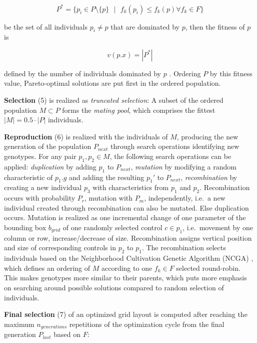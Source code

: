 \begin{equation}P^* = \big\{p_i \in P \setminus\{p\}  \text{ }|\text{ } f_k(p_i) \leq f_k(p) \forall f_k \in F \big\}\end{equation}

be the set of all individuals \(p_i \neq p\) that are dominated by \(p\), then the fitness of \(p\) is

\begin{equation}v(p.x) = |P^*|\label{eq:fitness}\end{equation}

defined by the number of individuals dominated by \(p\) \autocite{Weise2009Optimization}.
Ordering \(P\) by this fitness value, Pareto-optimal solutions are put first in the ordered population.

\textbf{Selection} (5) is realized as \emph{truncated selection}: A subset of the ordered population \(M \subset P\) forms the \emph{mating pool}, which comprises the fittest \(|M| = 0.5 \cdot |P|\) individuals.

\textbf{Reproduction} (6) is realized with the individuals of \(M\), producing the new generation of the population \(P_{next}\) through search operations identifying new genotypes.
For any pair \(p_1, p_2 \in M\), the following search operations can be applied: \emph{duplication} by adding \(p_1\) to \(P_{next}\), \emph{mutation} by modifying a random characteristic of \(p_1.g\) and adding the resulting \(p_1'\) to \(P_{next}\), \emph{recombination} by creating a new individual \(p_3\) with characteristics from \(p_1\) and \(p_2\).
Recombination occurs with probability \(P_{r}\), mutation with \(P_m\), independently, i.e.~a new individual created through recombination can also be mutated.
Else duplication occurs.
Mutation is realized as one incremental change of one parameter of the bounding box \(b_{grid}\) of one randomly selected control \(c \in p_1\), i.e.~movement by one column or row, increase/decrease of size.
Recombination assigns vertical position and size of corresponding controls in \(p_2\) to \(p_1\).
The recombination selects individuals based on the Neighborhood Cultivation Genetic Algorithm (NCGA) \autocite{Watanabe2002NCGA}, which defines an ordering of \(M\) according to one \(f_k\in F\) selected round-robin.
This makes genotypes more similar to their parents, which puts more emphasis on searching around possible solutions compared to random selection of individuals.

\textbf{Final selection} (7) of an optimized grid layout is computed after reaching the maximum \(n_{generations}\) repetitions of the optimization cycle from the final generation \(P_{last}\) based on \(F\):

